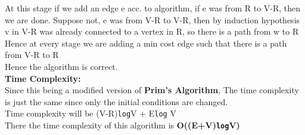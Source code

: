 \documentclass{report}
\begin{document}
  At this stage if we add an edge e acc. to algorithm, if e was from R to V-R, then we are done.
  Suppose not, e was from V-R to V-R, then by induction hypothesis v in V-R was already connected to a vertex in R, so there is a path from w to R\\
  Hence at every stage we are adding a min cost edge such that there is a path from V-R to R\\
  Hence the algorithm is correct.\\
  \textbf{Time Complexity:}\\
  Since this being a modified version of \textbf{Prim's Algorithm}, The time complexity is just the same since only the initial conditions are changed.\\
  Time complexity will be (V-R)\texttt{log}V + E\texttt{log} V\\
  There the time complexity of this algorithm is \textbf{O((E+V)\texttt{log}V)}
\end{document}
